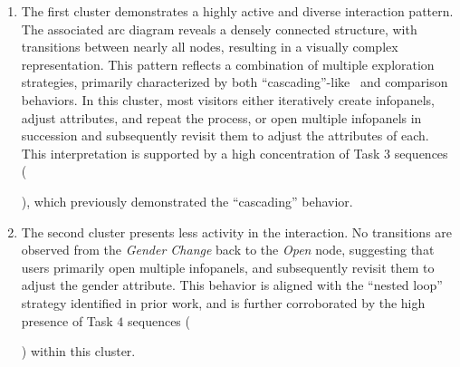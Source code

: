 \documentclass[preprint,journal]{vgtc}            %
\newcommand{\px}{0.0104167in} %
\begin{document}
\begin{enumerate}[noitemsep, topsep=0pt, parsep=0pt ,leftmargin=*]
    \item 
    The first cluster demonstrates a highly active and diverse interaction pattern.
    The associated arc diagram reveals a densely connected structure, with transitions between nearly all nodes, resulting in a visually complex representation.
    This pattern reflects a combination of multiple exploration strategies, primarily characterized by both ``cascading''-like~\cite{Yu25Revealing} and comparison behaviors.
    In this cluster, most visitors either iteratively create infopanels, adjust attributes, and repeat the process, or open multiple infopanels in succession and subsequently revisit them to adjust the attributes of each.
    This interpretation is supported by a high concentration of Task $3$ sequences (  ), which previously demonstrated the ``cascading'' behavior.

    \item The second cluster presents less activity in the interaction. 
    No transitions are observed from the \textit{Gender Change} back to the \textit{Open} node, suggesting that users primarily open multiple infopanels, and subsequently revisit them to adjust the gender attribute. 
    This behavior is aligned with the ``nested loop'' strategy identified in prior work, and is further corroborated by the high presence of Task $4$ sequences (  ) within this cluster.


\end{enumerate}
\end{document}
